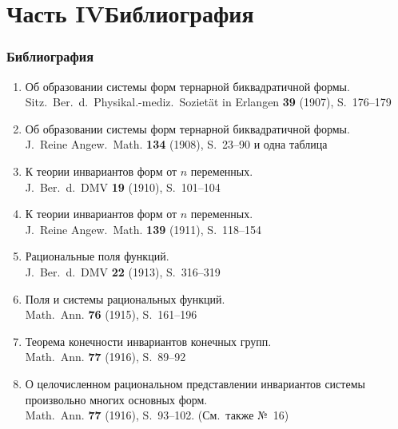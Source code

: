 \documentclass[11pt]{article}
\newcommand{\foreign}[1]{#1}
\begin{document}
\part*{Часть IV\hspace{1em}Библиография}

\section*{Библиография}

\begin{enumerate}[label={\small\arabic*.},leftmargin=2em,itemsep=0.3em]
\item Об образовании системы форм тернарной биквадратичной формы.\\
\foreign{Sitz.\ Ber.\ d.\ Physikal.-mediz.\ Sozietät in Erlangen} \textbf{39} (1907), S.~176--179

\item Об образовании системы форм тернарной биквадратичной формы.\\
\foreign{J.\ Reine Angew.\ Math.} \textbf{134} (1908), S.~23--90 и одна таблица

\item К теории инвариантов форм от $n$ переменных.\\
\foreign{J.\ Ber.\ d.\ DMV} \textbf{19} (1910), S.~101--104

\item К теории инвариантов форм от $n$ переменных.\\
\foreign{J.\ Reine Angew.\ Math.} \textbf{139} (1911), S.~118--154

\item Рациональные поля функций.\\
\foreign{J.\ Ber.\ d.\ DMV} \textbf{22} (1913), S.~316--319

\item Поля и системы рациональных функций.\\
\foreign{Math.\ Ann.} \textbf{76} (1915), S.~161--196

\item Теорема конечности инвариантов конечных групп.\\
\foreign{Math.\ Ann.} \textbf{77} (1916), S.~89--92

\item О целочисленном рациональном представлении инвариантов системы произвольно многих основных форм.\\
\foreign{Math.\ Ann.} \textbf{77} (1916), S.~93--102. (См.\ также №~16)


\end{enumerate}
\end{document}
